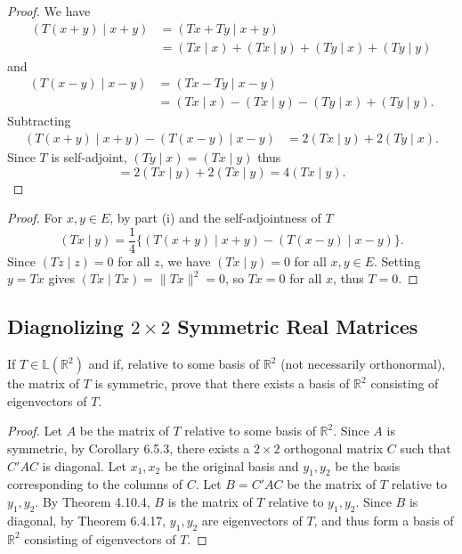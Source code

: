 \begin{proof}
    We have 
    \begin{align*}
        (T(x+y)\mid x+y) &= (Tx+Ty \mid x+y) \\
        &= (Tx\mid x) + (Tx\mid y) + (Ty\mid x) + (Ty\mid y)
    \end{align*}
    and
    \begin{align*}
        (T(x-y)\mid x-y) &= (Tx-Ty \mid x-y) \\
        &= (Tx\mid x) - (Tx\mid y) - (Ty\mid x) + (Ty\mid y).
    \end{align*}
    Subtracting
    \begin{align*}
        (T(x+y)\mid x+y) - (T(x-y)\mid x-y) &= 2(Tx\mid y) + 2(Ty\mid x).
    \end{align*}
    Since $T$ is self-adjoint, $(Ty\mid x) = (Tx \mid y)$ thus
    \[
        = 2(Tx\mid y) + 2(Tx\mid y) = 4(Tx\mid y). 
    \]
\end{proof}

\begin{proof}
    For $x, y \in E$, by part (i) and the self-adjointness of $T$
    \[
        (Tx \mid y) = \frac{1}{4}\{(T(x+y)\mid x+y) - (T(x-y)\mid x-y)\}.
    \]
    Since $(Tz \mid z) = 0$ for all $z$, we have $(Tx \mid y) = 0$ for all $x, y \in E$.
    Setting $y = Tx$ gives $(Tx \mid Tx) = \|Tx\|^2 = 0$, so $Tx = 0$ for all $x$, thus $T = 0$.
\end{proof}

\subsection{Diagnolizing $2 \times 2$ Symmetric Real Matrices}

\begin{tcolorbox}[title=Problem 2, breakable]
    If $T \in \mathbb{L}(\mathbb{R}^2)$ and if, relative to some 
    basis of $\mathbb{R}^2$ (not necessarily orthonormal), the matrix of 
    $T$ is symmetric, prove that there exists a basis of 
    $\mathbb{R}^2$ consisting of eigenvectors of $T$. 
\end{tcolorbox}

\begin{proof}
    Let $A$ be the matrix of $T$ relative to some basis of $\mathbb{R}^2$. Since $A$ is symmetric,
    by Corollary 6.5.3, there exists a $2 \times 2$
    orthogonal matrix $C$ such that $C'AC$ is diagonal.
    Let $x_1, x_2$ be the original basis and $y_1, y_2$ be the basis corresponding to the columns of $C$.
    Let $B = C'AC$ be the matrix of $T$ relative to $y_1, y_2$.
    By Theorem 4.10.4, $B$ is the matrix of $T$ relative to $y_1, y_2$. Since $B$ is diagonal,
    by Theorem 6.4.17, $y_1, y_2$ are eigenvectors of $T$, and thus form a basis of $\mathbb{R}^2$ consisting of eigenvectors of $T$.
\end{proof}

